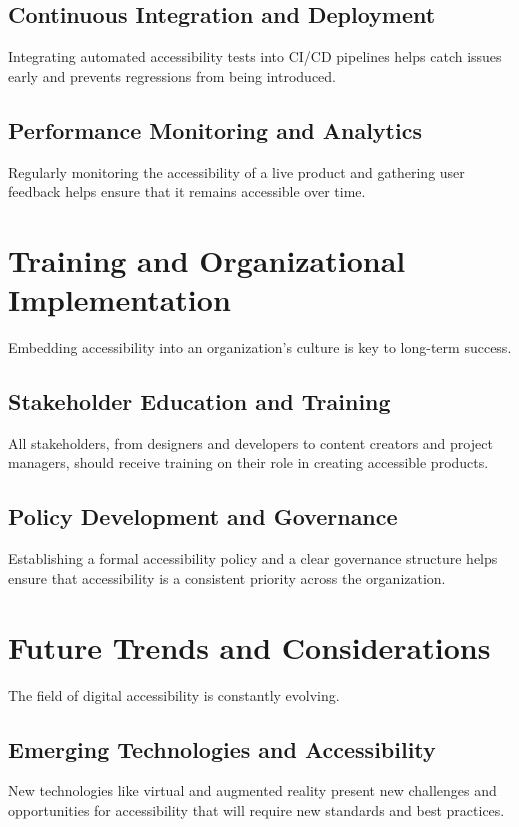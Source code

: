 \subsection{Continuous Integration and Deployment}
\label{subsec:ci-cd}
Integrating automated accessibility tests into CI/CD pipelines helps catch issues early and prevents regressions from being introduced.
\supercite{Fowler2013}

\subsection{Performance Monitoring and Analytics}
\label{subsec:performance-analytics}
Regularly monitoring the accessibility of a live product and gathering user feedback helps ensure that it remains accessible over time.

\section{Training and Organizational Implementation}
\label{sec:training-implementation}
Embedding accessibility into an organization's culture is key to long-term success.

\subsection{Stakeholder Education and Training}
\label{subsec:stakeholder-training}
All stakeholders, from designers and developers to content creators and project managers, should receive training on their role in creating accessible products.
\supercite{PEATTraining}

\subsection{Policy Development and Governance}
\label{subsec:policy-governance}
Establishing a formal accessibility policy and a clear governance structure helps ensure that accessibility is a consistent priority across the organization.
\supercite{Lazar2015}

\section{Future Trends and Considerations}
\label{sec:future-trends}
The field of digital accessibility is constantly evolving.

\subsection{Emerging Technologies and Accessibility}
\label{subsec:emerging-tech-a11y}
New technologies like virtual and augmented reality present new challenges and opportunities for accessibility that will require new standards and best practices.
\supercite{W3CEmergingTechA11y}

